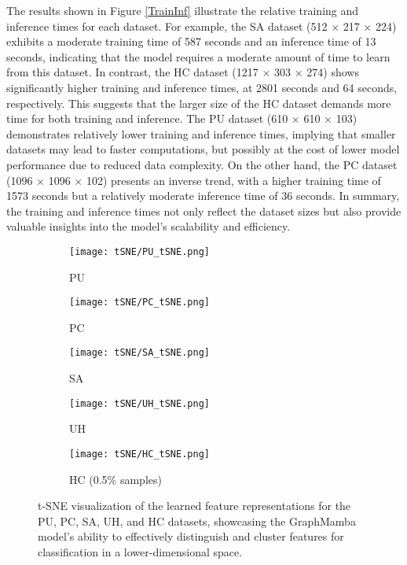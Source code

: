 \documentclass[journal]{IEEEtran}
\begin{document}
The results shown in Figure \ref{TrainInf} illustrate the relative training and inference times for each dataset. For example, the SA dataset (512 $\times$ 217 $\times$ 224) exhibits a moderate training time of 587 seconds and an inference time of 13 seconds, indicating that the model requires a moderate amount of time to learn from this dataset. In contrast, the HC dataset (1217 $\times$ 303 $\times$ 274) shows significantly higher training and inference times, at 2801 seconds and 64 seconds, respectively. This suggests that the larger size of the HC dataset demands more time for both training and inference. The PU dataset (610 $\times$ 610 $\times$ 103) demonstrates relatively lower training and inference times, implying that smaller datasets may lead to faster computations, but possibly at the cost of lower model performance due to reduced data complexity. On the other hand, the PC dataset (1096 $\times$ 1096 $\times$ 102) presents an inverse trend, with a higher training time of 1573 seconds but a relatively moderate inference time of 36 seconds. In summary, the training and inference times not only reflect the dataset sizes but also provide valuable insights into the model's scalability and efficiency.

\begin{figure*}[!hbt]
    \centering
	\begin{subfigure}{0.19\textwidth}
		\texttt{[image: tSNE/PU\_tSNE.png]}
		\caption{PU} 
		\label{Fig2A}
	\end{subfigure}
    \begin{subfigure}{0.19\textwidth}
		\texttt{[image: tSNE/PC\_tSNE.png]}
		\caption{PC}
		\label{Fig2B}
	\end{subfigure}
	\begin{subfigure}{0.19\textwidth}
		\texttt{[image: tSNE/SA\_tSNE.png]}
		\caption{SA}
		\label{Fig2C}
	\end{subfigure} 
	\begin{subfigure}{0.19\textwidth}
		\texttt{[image: tSNE/UH\_tSNE.png]}
		\caption{UH}
		\label{Fig2D}
	\end{subfigure}
    \begin{subfigure}{0.19\textwidth}
		\texttt{[image: tSNE/HC\_tSNE.png]}
		\caption{HC (0.5\% samples)}
		\label{Fig2E}
	\end{subfigure}
\caption{t-SNE visualization of the learned feature representations for the PU, PC, SA, UH, and HC datasets, showcasing the GraphMamba model's ability to effectively distinguish and cluster features for classification in a lower-dimensional space.}
\label{Fig2}
\end{figure*}
\end{document}
